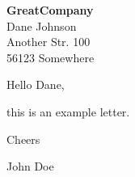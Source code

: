 \begin{letter}{\textbf{GreatCompany} \\ Dane Johnson \\ Another Str. 100 \\ 56123 Somewhere}
\onehalfspacing


\opening{Hello Dane,}

this is an example letter.

\vspace{\baselineskip}

Cheers

John Doe
\end{letter}
